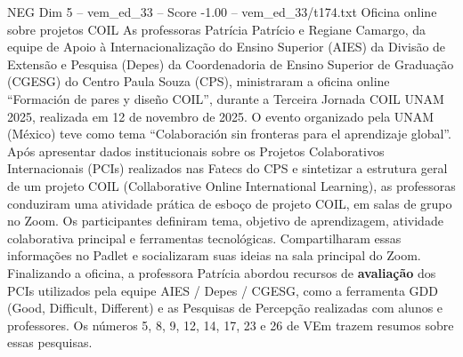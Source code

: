 \begin{textsample}{NEG Dim 5 – vem\_ed\_33 – Score -1.00 – vem\_ed\_33/t174.txt}  \label{ex:f5_neg_067}
Oficina online sobre projetos COIL As professoras Patrícia Patrício e Regiane Camargo, da equipe de Apoio à Internacionalização do Ensino Superior (AIES) da Divisão de Extensão e Pesquisa (Depes) da Coordenadoria de Ensino Superior de Graduação (CGESG) do Centro Paula Souza (CPS), ministraram a oficina online “Formación de pares y diseño COIL”, durante a Terceira Jornada COIL UNAM 2025, realizada em 12 de novembro de 2025.
O evento organizado pela UNAM (México) teve como tema “Colaboración sin fronteras para el aprendizaje global”.
Após apresentar dados institucionais sobre os Projetos Colaborativos Internacionais (PCIs) realizados nas Fatecs do CPS e sintetizar a estrutura geral de um projeto COIL (Collaborative Online International Learning), as professoras conduziram uma atividade prática de esboço de projeto COIL, em salas de grupo no Zoom.
Os participantes definiram tema, objetivo de aprendizagem, atividade colaborativa principal e ferramentas tecnológicas.
Compartilharam essas informações no Padlet e socializaram suas ideias na sala principal do Zoom.
Finalizando a oficina, a professora Patrícia abordou recursos de \textbf{avaliação} dos PCIs utilizados pela equipe AIES / Depes / CGESG, como a ferramenta GDD (Good, Difficult, Different) e as Pesquisas de Percepção realizadas com alunos e professores.
Os números 5, 8, 9, 12, 14, 17, 23 e 26 de VEm trazem resumos sobre essas pesquisas.

\end{textsample}
